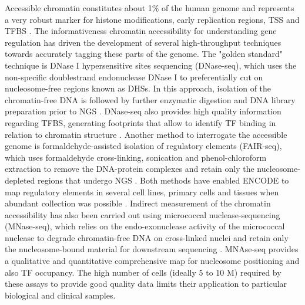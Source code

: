 Accessible chromatin constitutes about 1\% of the human genome and represents a very robust marker for histone modifications, early replication regions, TSS and TFBS \parencite{ENCODE2007}. The informativeness chromatin accessibility for understanding gene regulation has driven the development of several high-throughput techniques towards accurately tagging these parts of the genome. The "golden standard" technique is DNase I hypersensitive sites sequencing (DNase-seq), which uses the non-specific doublestrand endonuclease DNase I to preferentially cut on nucleosome-free regions known as DHSs. In this approach, isolation of the chromatin-free DNA is followed by further enzymatic digestion and DNA library preparation prior to NGS \parencite{John2013}. DNase-seq also provides high quality information regarding TFBS, generating footprints that allow to identify TF binding in relation to chromatin structure \parencite{Hesselberth2009,Boyle2010}. Another method to interrogate the accessible genome is formaldehyde-assisted isolation of regulatory elements (FAIR-seq), which uses formaldehyde cross-linking, sonication and phenol-chloroform extraction to remove the DNA-protein complexes and retain only the nucleosome-depleted regions that undergo NGS \parencite{Giresi2006}. Both methods have enabled ENCODE to map regulatory elements in several cell lines, primary cells and tissues when abundant collection was possible \parencite{ENCODE2007,Buck2014,Gaulton2010}. Indirect measurement of the chromatin accessibility has also been carried out using micrococcal nuclease-sequencing (MNase-seq), which relies on the endo-exonuclease activity of the micrococcal nuclease to degrade chromatin-free DNA on cross-linked nuclei and retain only the nucleosome-bound material for downstream sequencing \parencite{Axel1975,Ponts2010}. MNAse-seq provides a qualitative and quantitative comprehensive map for nucleosome positioning and also TF occupancy. The high number of cells (ideally 5 to 10 M) required by these assays to provide good quality data limits their application to particular biological and clinical samples. 

